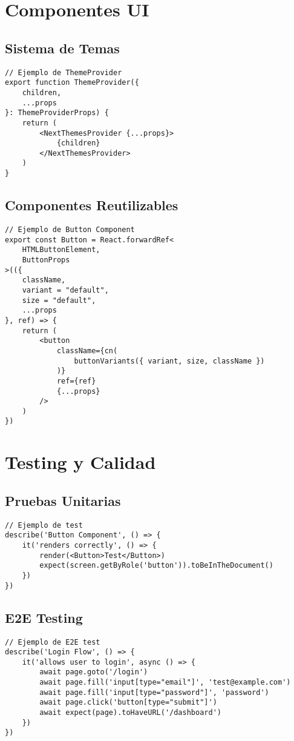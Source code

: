 \documentclass[12pt,a4paper]{report}
\begin{document}
\chapter{Componentes UI}

\section{Sistema de Temas}
\begin{verbatim}
// Ejemplo de ThemeProvider
export function ThemeProvider({ 
    children, 
    ...props 
}: ThemeProviderProps) {
    return (
        <NextThemesProvider {...props}>
            {children}
        </NextThemesProvider>
    )
}
\end{verbatim}

\section{Componentes Reutilizables}
\begin{verbatim}
// Ejemplo de Button Component
export const Button = React.forwardRef<
    HTMLButtonElement,
    ButtonProps
>(({ 
    className, 
    variant = "default", 
    size = "default", 
    ...props 
}, ref) => {
    return (
        <button
            className={cn(
                buttonVariants({ variant, size, className })
            )}
            ref={ref}
            {...props}
        />
    )
})
\end{verbatim}

\chapter{Testing y Calidad}

\section{Pruebas Unitarias}
\begin{verbatim}
// Ejemplo de test
describe('Button Component', () => {
    it('renders correctly', () => {
        render(<Button>Test</Button>)
        expect(screen.getByRole('button')).toBeInTheDocument()
    })
})
\end{verbatim}

\section{E2E Testing}
\begin{verbatim}
// Ejemplo de E2E test
describe('Login Flow', () => {
    it('allows user to login', async () => {
        await page.goto('/login')
        await page.fill('input[type="email"]', 'test@example.com')
        await page.fill('input[type="password"]', 'password')
        await page.click('button[type="submit"]')
        await expect(page).toHaveURL('/dashboard')
    })
})
\end{verbatim}
\end{document}
